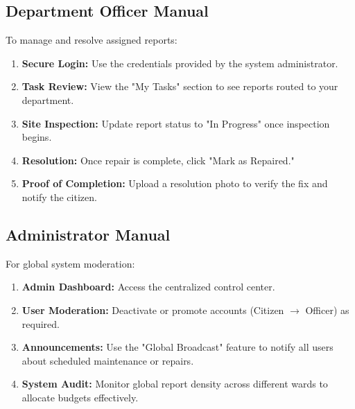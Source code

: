 \subsection{Department Officer Manual}
To manage and resolve assigned reports:
\begin{enumerate}
    \item \textbf{Secure Login:} Use the credentials provided by the system administrator.
    \item \textbf{Task Review:} View the "My Tasks" section to see reports routed to your department.
    \item \textbf{Site Inspection:} Update report status to "In Progress" once inspection begins.
    \item \textbf{Resolution:} Once repair is complete, click "Mark as Repaired."
    \item \textbf{Proof of Completion:} Upload a resolution photo to verify the fix and notify the citizen.
\end{enumerate}

\subsection{Administrator Manual}
For global system moderation:
\begin{enumerate}
    \item \textbf{Admin Dashboard:} Access the centralized control center.
    \item \textbf{User Moderation:} Deactivate or promote accounts (Citizen $\rightarrow$ Officer) as required.
    \item \textbf{Announcements:} Use the "Global Broadcast" feature to notify all users about scheduled maintenance or repairs.
    \item \textbf{System Audit:} Monitor global report density across different wards to allocate budgets effectively.
\end{enumerate}
